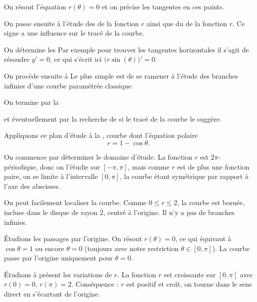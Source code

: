 \change
  On résout l'équation $r(\theta)=0$ 
et on précise les tangentes en ces points.

\change
On passe ensuite à l'étude des  de la fonction $r$ ainsi que du  de 
la fonction $r$. 
Ce signe a une influence sur le tracé 
de la courbe. 

\change
On détermine les  Par exemple 
pour trouver les tangentes horizontales
il s'agit de résoudre $y'=0$, ce qui s'écrit ici $\big(r\sin(\theta)\big)'=0$.


\change
On procède ensuite à   
Le plus simple est de se ramener à l'étude des branches 
infinies d'une courbe paramétrée classique. 

\change
On termine par la 

\change
et éventuellement 
par la recherche de  
si le tracé de la courbe le suggère. 

\diapo

Appliquons ce plan d'étude à la , 
courbe dont l'équation polaire 
$$r=1-\cos\theta.$$


\change
  On commence par déterminer le domaine d'étude. 
  La fonction $r$ est $2\pi$-périodique, 
  donc on l'étudie sur $[-\pi,\pi]$, mais 
  comme $r$ est de plus une fonction paire, on se 
  limite à l'intervalle $[0,\pi]$, la courbe étant 
  symétrique par rapport à l'axe des abscisses.

\change
  
   On peut facilement localiser la courbe. 
   Comme $0 \le r \le 2$, la courbe est bornée, 
   incluse dans le disque de rayon $2$, centré à l'origine. 
   Il n'y a pas de branches infinies.

\change

 Étudions les passages par l'origine. 
 On résout  $r(\theta)=0$, ce qui équivaut à  
 $\cos \theta  = 1$ ou encore $\theta = 0$ (toujours avec 
  notre restriction $\theta \in [0,\pi]$). 
  La courbe passe par l'origine uniquement pour $\theta = 0$.

\change
Étudions à présent les variations de $r$. 
La fonction $r$ est croissante sur $[0,\pi]$ 
avec $r(0)=0$, $r(\pi) = 2$. Conséquence : $r$ est positif 
et croît, on tourne dans le sens direct en s'écartant de l'origine.
 
